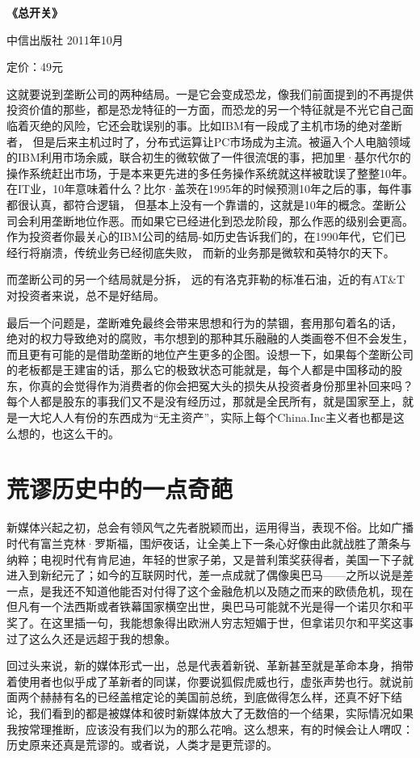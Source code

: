 \textbf{《总开关》}

中信出版社 2011年10月

定价：49元

这就要说到垄断公司的两种结局。一是它会变成恐龙，像我们前面提到的不再提供投资价值的那些，都是恐龙特征的一方面，而恐龙的另一个特征就是不光它自己面临着灭绝的风险，它还会耽误别的事。比如IBM有一段成了主机市场的绝对垄断者，
但是后来主机过时了，分布式运算让PC市场成为主流。被逼入个人电脑领域的IBM利用市场余威，联合初生的微软做了一件很流氓的事，把加里·基尔代尔的操作系统赶出市场，于是本来更先进的多任务操作系统就这样被耽误了整整10年。在IT业，10年意味着什么？比尔·盖茨在1995年的时候预测10年之后的事，每件事都很认真，都符合逻辑，
但基本上没有一个靠谱的，这就是10年的概念。垄断公司会利用垄断地位作恶。而如果它已经进化到恐龙阶段，那么作恶的级别会更高。作为投资者你最关心的IBM公司的结局-如历史告诉我们的，在1990年代，它们已经行将崩溃，传统业务已经彻底失败，
而新的业务那是微软和英特尔的天下。

而垄断公司的另一个结局就是分拆， 远的有洛克菲勒的标准石油，近的有AT\&T
对投资者来说，总不是好结局。

最后一个问题是，垄断难免最终会带来思想和行为的禁锢，套用那句着名的话，
绝对的权力导致绝对的腐败，韦尔想到的那种其乐融融的人类画卷不但不会发生，
而且更有可能的是借助垄断的地位产生更多的企图。设想一下，如果每个垄断公司的老板都是王建宙的话，那么它的极致状态可能就是，每个人都是中国移动的股东，你真的会觉得作为消费者的你会把冤大头的损失从投资者身份那里补回来吗？每个人都是股东的事我们又不是没有经历过，那就是全民所有，就是国家至上，就是一大坨人人有份的东西成为``无主资产''，实际上每个China.Inc主义者也都是这么想的，也这么干的。

\section{荒谬历史中的一点奇葩}

新媒体兴起之初，总会有领风气之先者脱颖而出，运用得当，表现不俗。比如广播时代有富兰克林·罗斯福，围炉夜话，让全美上下一条心好像由此就战胜了萧条与纳粹；电视时代有肯尼迪，年轻的世家子弟，又是普利策奖获得者，美国一下子就进入到新纪元了；如今的互联网时代，差一点成就了偶像奥巴马------之所以说是差一点，是我还不知道他能否对付得了这个金融危机以及随之而来的欧债危机，现在但凡有一个法西斯或者铁幕国家横空出世，奥巴马可能就不光是得一个诺贝尔和平奖了。在这里插一句，我能想象得出欧洲人穷志短媚于世，但拿诺贝尔和平奖这事过了这么久还是远超于我的想象。

回过头来说，新的媒体形式一出，总是代表着新锐、革新甚至就是革命本身，捎带着使用者也似乎成了革新者的同谋，你要说狐假虎威也行，虚张声势也行。就说前面两个赫赫有名的已经盖棺定论的美国前总统，到底做得怎么样，还真不好下结论，我们看到的都是被媒体和彼时新媒体放大了无数倍的一个结果，实际情况如果我按常理推断，应该没有我们以为的那么花哨。这么想来，有的时候会让人喟叹：历史原来还真是荒谬的。或者说，人类才是更荒谬的。

